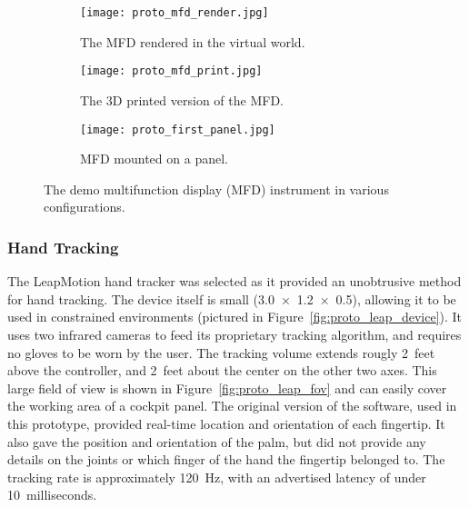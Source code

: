 \mbox{}\hfill
\begin{figure}
    \centering
    \begin{subfigure}[t]{0.3\linewidth}
        \centering
        \texttt{[image: proto\_mfd\_render.jpg]}
        \caption{The MFD rendered in the virtual world.}
        \label{fig:proto_mfd_render}
    \end{subfigure}\hfill
    \begin{subfigure}[t]{0.3\linewidth}
        \centering
        \texttt{[image: proto\_mfd\_print.jpg]}
        \caption{The 3D printed version of the MFD.}
        \label{fig:proto_mfd_print}
    \end{subfigure}\hfill
    \begin{subfigure}[t]{0.3\linewidth}
        \centering
        \texttt{[image: proto\_first\_panel.jpg]}
        \caption{MFD mounted on a panel.}
        \label{fig:proto_first_panel}
    \end{subfigure}
    \caption{The demo multifunction display (MFD) instrument in various configurations.}
    \label{fig:proto_mfd}
\end{figure}
\hfill\mbox{}


\subsubsection{Hand Tracking}

The LeapMotion hand tracker was selected as it provided an unobtrusive method for hand tracking.
The device itself is small (\SI{3.0 x 1.2 x 0.5}{\inch}), allowing it to be used in constrained environments (pictured in Figure~\ref{fig:proto_leap_device}).
It uses two infrared cameras to feed its proprietary tracking algorithm, and requires no gloves to be worn by the user.
The tracking volume extends rougly \num{2}~feet above the controller, and \num{2}~feet about the center on the other two axes.
This large field of view is shown in Figure~\ref{fig:proto_leap_fov} and can easily cover the working area of a cockpit panel.
The original version of the software, used in this prototype, provided real-time location and orientation of each fingertip.
It also gave the position and orientation of the palm, but did not provide any details on the joints or which finger of the hand the fingertip belonged to.
The tracking rate is approximately \SI{120}{\hertz}, with an advertised latency of under \num{10}~milliseconds.

